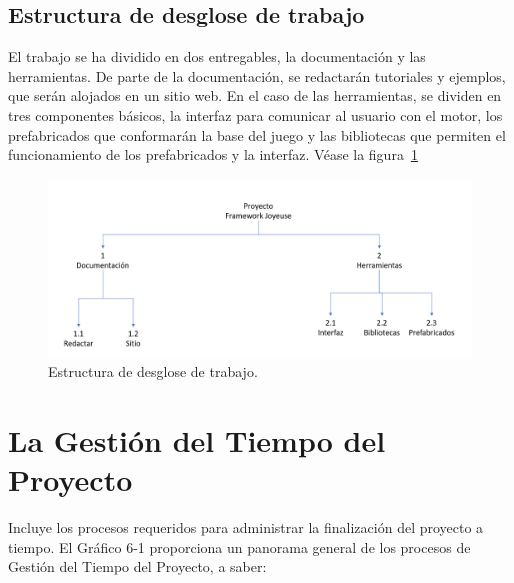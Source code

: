 \documentclass[]{article}
\begin{document}
\subsection{Estructura de desglose de trabajo}


El trabajo se ha dividido en dos entregables, la documentaci\'on y las herramientas. De parte de la documentaci\'on, se redactar\'an tutoriales y ejemplos, que ser\'an alojados en un sitio web. \newline
En el caso de las herramientas, se dividen en tres componentes b\'asicos, la interfaz para comunicar al usuario con el motor, los prefabricados que conformar\'an la base del juego y las bibliotecas que permiten el funcionamiento de los prefabricados y la interfaz. V\'ease la figura~\ref{EDT4}

\begin{figure}[H]
	
	\centering
	\includegraphics[width=1\textwidth]{EDT}
	\caption{Estructura de desglose de trabajo.} 
	\label{EDT4}
	
\end{figure}

\section{La Gesti\'on del Tiempo del Proyecto}
Incluye los procesos requeridos para administrar la
finalizaci\'on del proyecto a tiempo. El Gr\'afico 6-1 proporciona un panorama general de los procesos de Gesti\'on del Tiempo del Proyecto, a saber:
\end{document}
